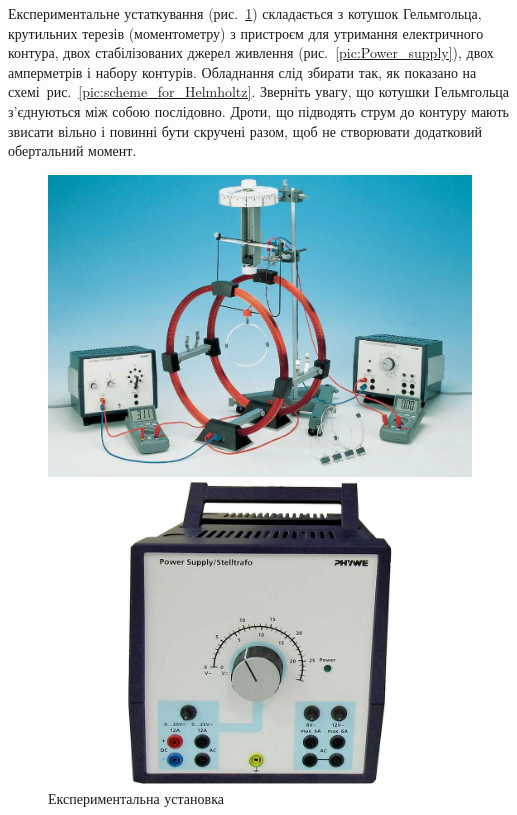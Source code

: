 \documentclass{LabWork}
\begin{document}
Експериментальне устаткування (рис.~\ref{pic:Experimental_installation}) складається з котушок Гельмгольца, крутильних терезів (моментометру) з пристроєм для утримання електричного контура, двох стабілізованих джерел живлення (рис.~\ref{pic:Power_supply}), двох амперметрів і набору контурів. Обладнання слід збирати так, як показано на схемі~рис.~\ref{pic:scheme_for_Helmholtz}. Зверніть увагу, що котушки Гельмгольца з'єднуються між собою послідовно. Дроти, що підводять струм до контуру мають звисати вільно і повинні бути скручені разом, щоб не створювати додатковий обертальний момент.
\begin{figure}[h!]\centering
	\begin{minipage}[t]{0.47\linewidth}
		\begin{tornpage}\centering
			\includegraphics[width=1\linewidth]{Experimental_installation}
			\caption{Експериментальна установка}
			\label{pic:Experimental_installation}
		\end{tornpage}
	\end{minipage}
	\quad%
	\begin{minipage}[t]{0.47\linewidth}
		\begin{tornpage}\centering
			\includegraphics[width=1\linewidth]{Power_supply}

\end{tornpage}
\end{minipage}
\end{figure}
\end{document}
